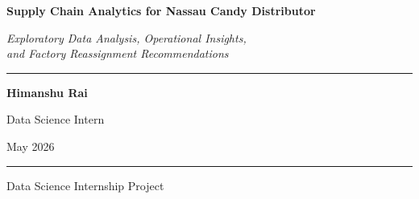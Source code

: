 \documentclass[12pt, a4paper]{article}
\begin{document}
\begin{titlepage}
    \centering
    \vspace*{3.5cm}

    {\LARGE\bfseries Supply Chain Analytics for Nassau Candy Distributor\par}
    \vspace{0.6em}
    {\large\itshape Exploratory Data Analysis, Operational Insights,\\[0.25em]
    and Factory Reassignment Recommendations\par}

    \vspace{2.2cm}
    \rule{\textwidth}{0.4pt}
    \vspace{2.2cm}

    {\normalsize\textbf{Himanshu Rai}\par}
    \vspace{0.5cm}
    {\normalsize Data Science Intern\par}
    \vspace{0.5cm}
    {\normalsize May 2026\par}

    \vfill
    \rule{\textwidth}{0.4pt}
    \vspace{0.4cm}
    {\small Data Science Internship Project\par}
\end{titlepage}
\end{document}
